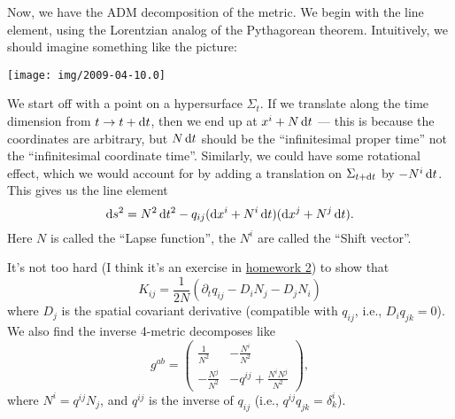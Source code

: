 Now, we have the ADM decomposition of the metric. We begin with the line
element, using the Lorentzian analog of the Pythagorean theorem.
Intuitively, we should imagine something like the picture:
\begin{center}
\texttt{[image: img/2009-04-10.0]}
\end{center}
We start off with a point on a hypersurface $\Sigma_{t}$. If we
translate along the time dimension from $t\to t+\mathrm{d} t$, then we end up at
$x^{i}+N\,\mathrm{d} t$ --- this is because the coordinates are arbitrary, but
$N\,\mathrm{d} t$ should be the ``infinitesimal proper time'' not the
``infinitesimal coordinate time''. Similarly, we could have some
rotational effect, which we would account for by adding a translation on
$\Sigma_{t+\mathrm{d} t}$ by $-N^{i}\,\mathrm{d} t$. This gives us the line element
\begin{equation}
\mathrm{d} s^{2} = N^{2}\,\mathrm{d} t^{2} - q_{ij}(\mathrm{d} x^{i} + N^{i}\,\mathrm{d} t)(\mathrm{d} x^{j} + N^{j}\,\mathrm{d} t).
\end{equation}
Here $N$ is called the ``Lapse function'', the $N^{i}$ are called the
``Shift vector''.

It's not too hard (I think it's an exercise
in \hyperref[section:hw2]{homework 2}) to show that
\begin{equation}
K_{ij} = \frac{1}{2N}(\partial_{t}q_{ij} - D_{i}N_{j}-D_{j}N_{i})
\end{equation}
where $D_{j}$ is the spatial covariant derivative (compatible with
$q_{ij}$, i.e., $D_{i}q_{jk}=0$). We also find the inverse 4-metric
decomposes like
\begin{equation}
g^{ab} = \begin{pmatrix}\frac{1}{N^{2}} & -\frac{N^{i}}{N^{2}}\\-\frac{N^{j}}{N^{2}} & -q^{ij} + \frac{N^{i}N^{j}}{N^{2}} \end{pmatrix},
\end{equation}
where $N^{i}=q^{ij}N_{j}$, and $q^{ij}$ is the inverse of $q_{ij}$
(i.e., $q^{ij}q_{jk}=\delta^{i}_{k}$).

